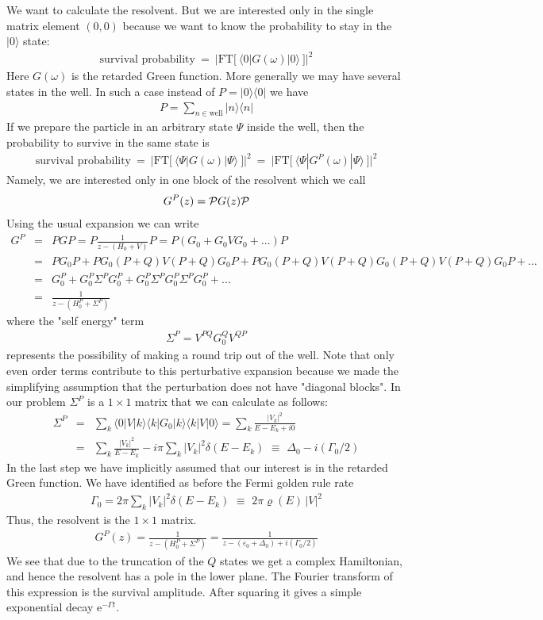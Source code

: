 \documentclass[onecolumn,fleqn, 11pt]{revtex4}
\newcommand{\eexp}{\mathrm{e}^}
\newcommand{\gdos}{\varrho} \newcommand{\EPS}{\mathcal{E}}
\newcommand{\beq}{\begin{eqnarray}}
\newcommand{\eeq}{\end{eqnarray}}
\begin{document}
We want to calculate the resolvent.
But we are interested only in the single matrix element $(0,0)$ 
because we want to know the probability to stay 
in the $|0\rangle$ state: 
\beq 
\mbox{survival probability} \ = \  
\Big| \mbox{FT} \Big[ \ \langle 0  | G(\omega)  |0  \rangle \ \Big] \Big|^2
\eeq
Here $G(\omega)$ is the retarded Green function. 
More generally we may have several states in the well. 
In such a case instead of $P=|0 \rangle \langle 0|$ 
we have 
\beq 
P=\sum_{n\in \mbox{well}}  |n\rangle \langle n| 
\eeq
If we prepare the particle in an arbitrary state $\Psi$ 
inside the well, then the probability to survive 
in the same state is 
\beq 
\mbox{survival probability} \ = \  
\Big| \mbox{FT} \Big[ \ \langle \Psi  | G(\omega)  | \Psi  \rangle \ \Big] \Big|^2
\ = \ 
\Big| \mbox{FT} \Big[ \ \langle \Psi  | G^P(\omega)  | \Psi  \rangle \ \Big] \Big|^2
\eeq
Namely, we are interested only in one block of the resolvent which we call 
\beq
G^P(z) = {\cal P} G(z) {\cal P}
\eeq
Using the usual expansion we can write 
\beq 
G^P &=& PGP 
= P\frac{1}{z-(H_0+V)}P
= P(G_0 + G_0 V G_0 + \dots )P 
\\ \nonumber
&=& PG_0P + PG_0(P+Q)V(P+Q)G_0 P + PG_0(P+Q)V(P+Q)G_0(P+Q)V(P+Q)G_0P+\dots  
\\ \nonumber
&=& G_0^P + G_0^P \Sigma^P G_0^P+G_0^P \Sigma^P G_0^P \Sigma^P G_0^P +\dots  
\\ \nonumber
&=& \frac{1}{z-(H_0^P+\Sigma^P)}
\eeq
where the "self energy" term 
\beq
\Sigma^P = V^{PQ} G_0^Q V^{QP} 
\eeq
represents the possibility of making a round trip out of the well.
Note that only even order terms contribute to this perturbative expansion 
because we made the simplifying assumption  
that the perturbation does not have "diagonal blocks". 
In our problem $\Sigma^P$ is a $1\times 1$ matrix that 
we can calculate as follows: 
\beq 
{\Sigma}^P &=& \sum_k 
\langle 0 | V |k \rangle
\langle k | G_0 | k \rangle 
\langle k | V  |0 \rangle =
\sum_k \frac{|V_k|^2}{E-E_k+i0} 
\\ \nonumber
&=& 
\sum_k
\frac{|V_k|^2}{E-E_k} 
- i \pi \sum_k|V_k|^2 \delta (E-E_k) 
\,\,\equiv\,\,
\Delta_0 - i (\Gamma_0/2)
\eeq
In the last step we have implicitly assumed that our interest is in the retarded Green function. 
We have identified as before the Fermi golden rule rate 
\beq 
\Gamma_0 = 
2\pi \sum_k|V_k|^2 \delta (E-E_k) 
\,\,\equiv\,\,
2\pi \gdos(E) \, |V|^2 
\eeq
Thus, the resolvent is the $1\times 1$ matrix.
\beq 
G^P(z)  = \frac{1}{z-(H_0^P+{\Sigma}^P)}=
\frac{1}{z-(\varepsilon_0+\Delta_0)+i(\Gamma_0/2)} 
\eeq
We see that due to the truncation of the $Q$ states we get 
a complex Hamiltonian, and hence the resolvent 
has a pole in the lower plane. The Fourier transform 
of this expression is the survival amplitude. After squaring 
it gives a simple exponential decay $\eexp{-\Gamma t}$.
\end{document}
